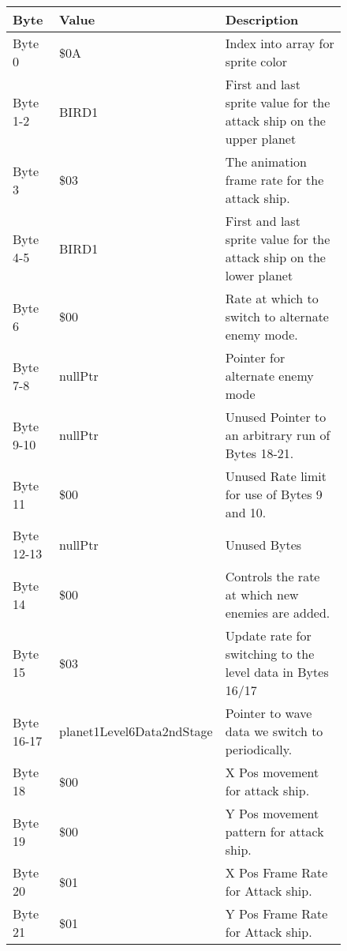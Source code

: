 \begin{figure}[H]
{\begin{adjustbox}{width=12cm}
\begin{tabular}{lll}
\toprule
 Byte       & Value                     & Description                                                         \\
\midrule
 Byte 0     & \$0A                       & Index into array for sprite color                                   \\
 Byte 1-2   & BIRD1                     & First and last sprite value for the attack ship on the upper planet \\
 Byte 3     & \$03                       & The animation frame rate for the attack ship.                       \\
 Byte 4-5   & BIRD1                     & First and last sprite value for the attack ship on the lower planet \\
 Byte 6     & \$00                       & Rate at which to switch to alternate enemy mode.                    \\
 Byte 7-8   & nullPtr                   & Pointer for alternate enemy mode                                    \\
 Byte 9-10  & nullPtr                   & Unused Pointer to an arbitrary run of Bytes 18-21.                  \\
 Byte 11    & \$00                       & Unused Rate limit for use of Bytes 9 and 10.                        \\
 Byte 12-13 & nullPtr                   & Unused Bytes                                                        \\
 Byte 14    & \$00                       & Controls the rate at which new enemies are added.                   \\
 Byte 15    & \$03                       & Update rate for switching to the level data in Bytes 16/17          \\
 Byte 16-17 & planet1Level6Data2ndStage & Pointer to wave data we switch to periodically.                     \\
 Byte 18    & \$00                       & X Pos movement for attack ship.                                     \\
 Byte 19    & \$00                       & Y Pos movement pattern for attack ship.                             \\
 Byte 20    & \$01                       & X Pos Frame Rate for Attack ship.                                   \\
 Byte 21    & \$01                       & Y Pos Frame Rate for Attack ship.                                   \\

\end{tabular}
\end{adjustbox}}
\end{figure}
